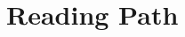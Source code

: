 \documentclass[11pt,a4paper]{article}
\begin{document}


{\small}

\newpage 
\appendix

\section{Reading Path}

\end{document}
